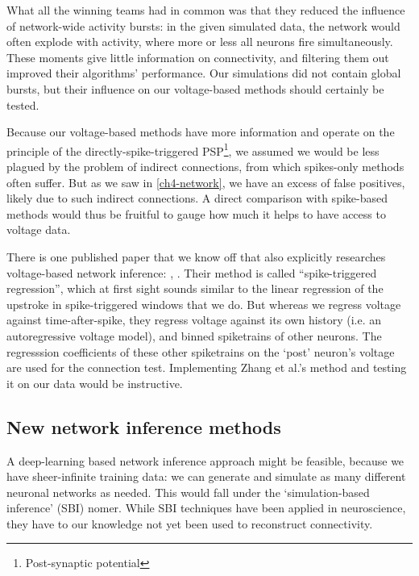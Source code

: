 What all the winning teams had in common was that they reduced the influence of network-wide activity bursts: in the given simulated data, the network would often explode with activity, where more or less all neurons fire simultaneously. These moments give little information on connectivity, and filtering them out improved their algorithms' performance.
Our simulations did not contain global bursts, but their influence on our voltage-based methods should certainly be tested.

Because our voltage-based methods have more information and operate on the principle of the directly-spike-triggered PSP\footnote{Post-synaptic potential}, we assumed we would be less plagued by the problem of indirect connections, from which spikes-only methods often suffer. But as we saw in \cref{ch4-network}, we have an excess of false positives, likely  due to such indirect connections. A direct comparison with spike-based methods would thus be fruitful to gauge how much it helps to have access to voltage data.

There is one published paper that we know off that also explicitly researches voltage-based network inference: , \cite{Zhang2017SpikeTriggeredRegressionSynaptic}.
Their method is called ``spike-triggered regression'', which at first sight sounds similar to the linear regression of the upstroke in spike-triggered windows that we do. But whereas we regress voltage against time-after-spike, they regress voltage against its own history (i.e. an autoregressive voltage model), and binned spiketrains of other neurons.
The regresssion coefficients of these other spiketrains on the `post' neuron's voltage are used for the connection test.
Implementing Zhang et al.'s method and testing it on our data would be instructive.


\subsection{New network inference methods}


A deep-learning based network inference approach might be feasible, because we have sheer-infinite training data: we can generate and simulate as many different neuronal networks as needed. This would fall under the `simulation-based inference' (SBI) nomer.\cite{Cranmer2020FrontierSimulationbasedInference} While SBI techniques have been applied in neuroscience\cite{Goncalves2020TrainingDeepNeural}, they have to our knowledge not yet been used to reconstruct connectivity.


